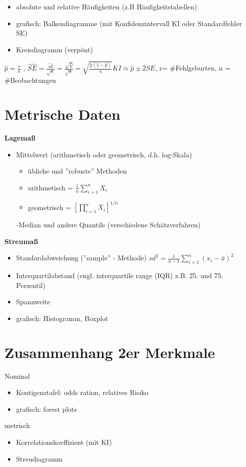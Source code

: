 \documentclass[10pt]{report}
\theoremstyle{definition}
\begin{document}
\begin{itemize}
	\item absolute und relative Häufigkeiten (z.B Häufigkeitstabellen)
	\item grafisch: Balkendiagramme (mit Konfidenzintervall KI oder Standardfehler SE)
	\item Kreisdiagramm (verpönt)
\end{itemize}


$\hat{p} = \frac{r}{n}$ , $\hat{SE} = \frac{\hat{sd}}{\sqrt{n}}= \frac{\sqrt{\hat{V}}}{\sqrt{n}} = \sqrt{\frac{\hat{p} (1- \hat{p})}{n}}
KI \approx \hat{p} \pm 2 SE$, r= \#Fehlgeburten, n = \#Beobachtungen 


\section{Metrische Daten}
\textbf{Lagemaß}
\begin{itemize}
	\item Mittelwert (arithmetisch oder geometrisch, d.h. log-Skala)
	\begin{itemize}
		\item übliche und ''robuste'' Methoden
		\item arithmetisch  = $\frac{1}{n}\sum_{i=1}^{n} X_i$
		\item geometrisch  = $[ \prod_{i=1}^{n} X_i]^{1/n}$
	\end{itemize}
	-Median und andere Quantile (verschiedene Schätzverfahren)
\end{itemize}
\textbf{Streumaß}
\begin{itemize}
	\item Standardabweichung (''sample'' - Methode) $sd^2 = \frac{1}{n-1} \sum_{i=1}^{n}(x_i - \bar{x})^2$
	\item Interquartilabstand (engl. interquartile range (IQR) z.B. 25. und 75. Perzentil)
	\item Spannweite
	\item grafisch: Histogramm, Boxplot	
\end{itemize}

\section{Zusammenhang 2er Merkmale}
Nominal
\begin{itemize}
	\item Kontigenztafel: odds ration, relatives Risiko
	\item grafisch: forest plots
\end{itemize}
metrisch
\begin{itemize}
	\item Korrelationskoeffizient (mit KI)
	\item Streudiagramm
\end{itemize}
\end{document}
